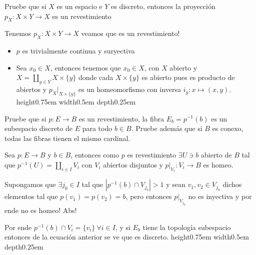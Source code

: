 \documentclass[11pt]{article}
\newenvironment{proof}[1][Demostraci\'on]{\begin{trivlist}
\item[\hskip \labelsep {\bfseries #1}]}{\end{trivlist}}
\newcommand{\qed}{\nobreak \ifvmode \relax \else
      \ifdim\lastskip<1.5em \hskip-\lastskip
      \hskip1.5em plus0em minus0.5em \fi \nobreak
      \vrule height0.75em width0.5em depth0.25em\fi}
\begin{document}
\begin{enumerate}

\item {Pruebe que si $X$ es un espacio e $Y$ es discreto, entonces la proyecci\'on $p_X:X\times Y\to X$ es un revestimiento}

\begin{proof}

Tenemos $p_X : X \times Y \rightarrow X$ veamos que es un revestimiento!

\begin{itemize}

\item $p$ es trivialmente continua y suryectiva

\item Sea $x_0 \in X$, entonces tenemos que $x_0 \in X$, con $X$ abierto y $X = \coprod_{y \in Y}{X \times \{y\}}$ donde cada $X \times \{y\}$ es abierto pues es producto de abiertos y $p_{X}|_{X \times \{y\}}$ es un homeomorfismo con inversa $i_{y}: x \mapsto (x,y)$. \qed

\end{itemize}

\end{proof}

\item {Pruebe que si $p:E\to B$ es un revestimiento, la fibra $E_b=p^{-1}(b)$ es un subespacio discreto de $E$ para todo $b\in B$. Pruebe además que si $B$ es conexo, todas las fibras tienen el mismo cardinal.
}

\begin{proof}

Sea $p:E \rightarrow B$ y $b \in B$, entonces como $p$ es revestimiento $\exists U \ni b$ abierto de $B$ tal que $p^{-1}(U) = \coprod _{i \in I}{V_i}$ con $V_i$ abiertos disjuntos y $p|_{V_i}:V_i \rightarrow B$ es homeo. 

Supongamos que $\exists j_0 \in I$ tal que $\left| p^{-1}(b) \cap V_{j_0} \right| > 1$ y sean $v_1,v_2 \in V_{j_0}$ dichos elementos tal que $p(v_1)=p(v_2) = b$, pero entonces $p|_{V_{j_0}}$ no es inyectiva y por ende no es homeo! Abs! 

Por ende $p^{-1}(b) \cap V_i = \{v_i\} \ \forall i \in I$, y si $E_b$ tiene la topolog\'ia subespacio entonces de la ecuaci\'on anterior se ve que es discreto. \qed

\end{proof}


\end{enumerate}
\end{document}
